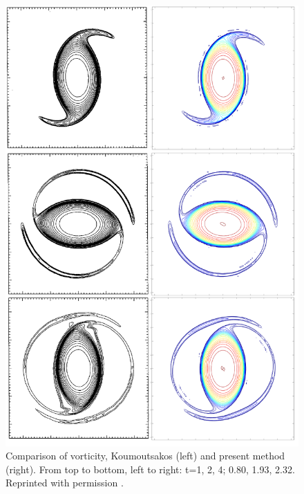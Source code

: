 \documentclass[letterpaper,12pt]{report}
\begin{document}
\begin{figure}
\centering
\includegraphics[width=1\textwidth]{KoumComp1.PNG}
\caption{\label{fig:KoumComp1}Comparison of vorticity, Koumoutsakos \cite{Koum1997} (left) and present method (right). From top to bottom, left to right: t=1, 2, 4; 0.80, 1.93, 2.32. Reprinted with permission \cite{KoumLic}.}
\end{figure}
\end{document}
